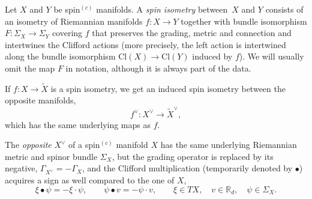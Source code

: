 \documentclass[pdftex]{sigma}
\numberwithin{equation}{section}
\newcommand{\R}{\mathbb{R}}
\newcommand{\Cl}{\mathrm{Cl}}
\begin{document}
\begin{Definition}
Let $X$ and $Y$ be spin$^{(c)}$ manifolds.
A \emph{spin isometry} between~$X$ and $Y$ consists of an isometry of Riemannian manifolds $f\colon X \to Y$ together with bundle isomorphism $F\colon \Sigma_X \to \Sigma_Y$ covering $f$ that preserves the grading, metric and connection and intertwines the Clifford actions (more precisely, the left action is intertwined along the bundle isomorphism $\Cl(X) \to \Cl(Y)$ induced by $f$).
We will usually omit the map $F$ in notation, although it is always part of the data.
\end{Definition}

If $f\colon X \to \tilde{X}$ is a spin isometry, we get an induced spin isometry between the opposite manifolds,
\[ %
f^\vee\colon X^\vee \to \tilde{X}^\vee,
\]
which has the same underlying maps as $f$.

\begin{Construction}[opposite]
The \emph{opposite} $X^\vee$ of a spin$^{(c)}$ manifold $X$ has the same underlying Riemannian metric and spinor bundle $\Sigma_X$, but the grading operator is replaced by its negative, $\Gamma_{X^\vee} = - \Gamma_X$, and the Clifford multiplication (temporarily denoted by $\bullet$) acquires a sign as well compared to the one of $X$,
\begin{equation*}
 \xi \bullet \psi = - \xi \cdot \psi, \qquad \psi \bullet v = - \psi \cdot v, \qquad \xi \in TX, \quad v \in \R_d,\quad \psi \in \Sigma_X.
\end{equation*}
\end{Construction}
\end{document}
